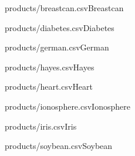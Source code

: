 \documentclass[]{article}
\begin{document}
{\begin{table}[!ht]
    \parbox{.45\linewidth}{
	    \begin{ride}{products/breastcan.csv}{Breastcan}\end{ride}
	}
	\hfill
    \parbox{.45\linewidth}{
	    \begin{ride}{products/diabetes.csv}{Diabetes}\end{ride}
	}
\end{table}


\begin{table}[!ht]
    \parbox{.45\linewidth}{
	    \begin{ride}{products/german.csv}{German}\end{ride}
	}
	\hfill
    \parbox{.45\linewidth}{
	    \begin{ride}{products/hayes.csv}{Hayes}\end{ride}
	}
\end{table}

\begin{table}[!ht]
    \parbox{.45\linewidth}{
	    \begin{ride}{products/heart.csv}{Heart}\end{ride}
	}
	\hfill
    \parbox{.45\linewidth}{
	    \begin{ride}{products/ionosphere.csv}{Ionosphere}\end{ride}
	}
\end{table}

\begin{table}[!ht]
    \parbox{.45\linewidth}{
	    \begin{ride}{products/iris.csv}{Iris}\end{ride}
	}
	\hfill
    \parbox{.45\linewidth}{
	    \begin{ride}{products/soybean.csv}{Soybean}\end{ride}
	}
\end{table}



}
\end{document}
